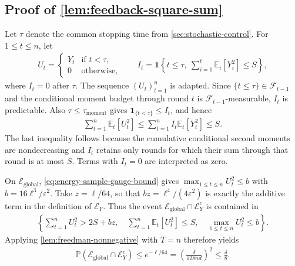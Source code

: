 \documentclass[12pt,cleveref]{jmlr}
\renewenvironment{proof}[1][\proofname]
{\par\noindent{\bfseries\upshape #1\ }}
{\jmlrQED}
\newcommand{\E}{\mathbb E}
\newcommand{\Pp}{\mathbb P}
\newcommand{\F}{\mathcal F}
\newcommand{\1}{\mathbf 1}
\newcommand{\eps}{\varepsilon}
\begin{document}
\subsection{Proof of \cref{lem:feedback-square-sum}}
\label{app:feedback-square-sum}
\begin{proof}
    Let $\tau$ denote the common stopping time from \cref{sec:stochastic-control}.
    For $1\leq t\leq n$, let
    \begin{align}
        U_t=
        \begin{cases}
            Y_t & \text{if }t<\tau, \\
            0   & \text{otherwise},
        \end{cases}
        \qquad
        I_t=\1\left\{t\leq\tau,\ \sum_{i=1}^t\E_i[Y_i^2]\leq S\right\},
    \end{align}
    where $I_t=0$ after $\tau$. The sequence $(U_t)_{t=1}^n$ is
    adapted. Since $\{t\leq\tau\}\in\F_{t-1}$ and the conditional
    moment budget through round $t$ is $\F_{t-1}$-measurable,
    $I_t$ is predictable. Also $\tau\leq\tau_{\mathrm{moment}}$ gives
    $\1_{\{t<\tau\}}\leq I_t$, and hence
    \begin{align}
        \sum_{t=1}^n\E_t[U_t^2]
        \leq\sum_{t=1}^n I_t\E_t[Y_t^2]\leq S.
    \end{align}
    The last inequality follows because the cumulative conditional
    second moments are nondecreasing and $I_t$ retains only rounds
    for which their sum through that round is at most $S$.
    Terms with $I_t=0$ are interpreted as zero.

    On $\mathcal E_{\mathrm{global}}$,
    \cref{eq:energy-sample-gauge-bound} gives
    $\max_{1\leq t\leq n}U_t^2\leq b$ with
    $b=16\ell^3/\eps^2$. Take $z=\ell/64$, so that
    $bz=\ell^4/(4\eps^2)$ is exactly the additive term in the definition
    of $\mathcal E_Y$. Thus the event
    $\mathcal E_{\mathrm{global}}\cap\mathcal E_Y^c$ is contained in
    \begin{align}
        \left\{
            \sum_{t=1}^nU_t^2>2S+bz,\quad
            \sum_{t=1}^n\E_t[U_t^2]\leq S,\quad
            \max_{1\leq t\leq n}U_t^2\leq b
        \right\}.
    \end{align}
    Applying \cref{lem:freedman-nonnegative} with $T=n$ therefore yields
    \begin{align}
        \Pp\left(\mathcal E_{\mathrm{global}}\cap\mathcal E_Y^c\right)
        \leq e^{-\ell/64}
        =\left(\frac{\delta}{128nd}\right)^2
        \leq\frac\delta8.
    \end{align}
\end{proof}
\end{document}
